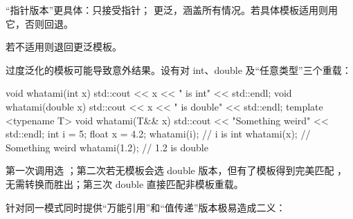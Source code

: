 “指针版本”更具体：只接受指针； 更泛，涵盖所有情况。若具体模板适用则用它，否则回退。

若不适用则退回更泛模板。

过度泛化的模板可能导致意外结果。设有对 int、double 及“任意类型”三个重载：

\begin{code}
void whatami(int x) {
  std::cout << x << " is int" << std::endl;
}
void whatami(double x) {
  std::cout << x << " is double" << std::endl;
}
template <typename T> void whatami(T&& x) {
  std::cout << "Something weird" << std::endl;
}
int i = 5;
float x = 4.2;
whatami(i);    // i is int
whatami(x);    // Something weird
whatami(1.2);    // 1.2 is double
\end{code}

第一次调用选 ；第二次若无模板会选 double 版本，但有了模板得到完美匹配 ，无需转换而胜出；第三次 double 直接匹配非模板重载。

针对同一模式同时提供“万能引用”和“值传递”版本极易造成二义：


